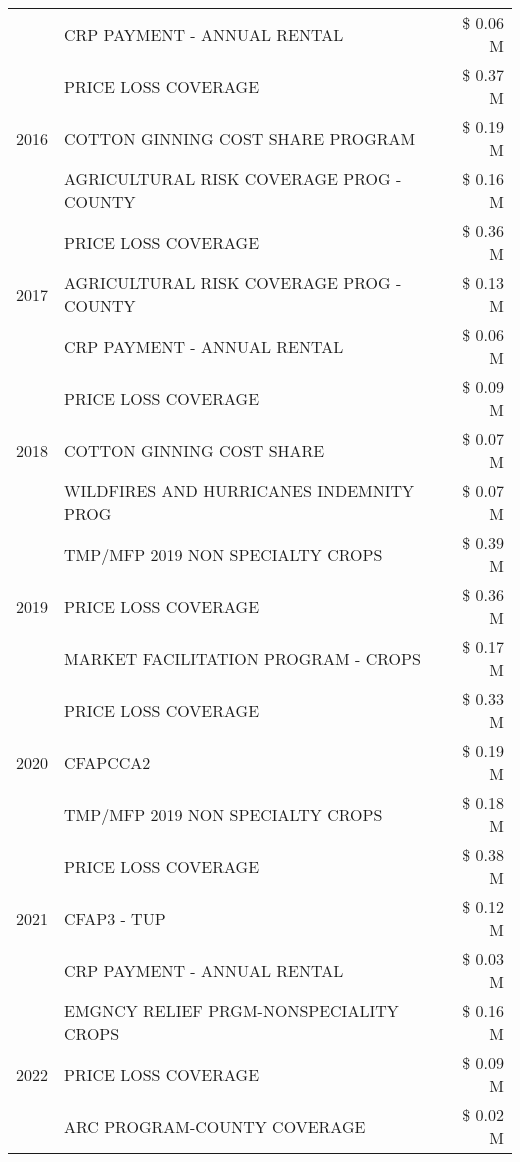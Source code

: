 \begin{tabular}{llr}
 & CRP PAYMENT - ANNUAL RENTAL & \$ 0.06 M \\
\cline{1-3}
\multirow[t]{3}{*}{2016} & PRICE LOSS COVERAGE & \$ 0.37 M \\
 & COTTON GINNING COST SHARE PROGRAM & \$ 0.19 M \\
 & AGRICULTURAL RISK COVERAGE PROG - COUNTY & \$ 0.16 M \\
\cline{1-3}
\multirow[t]{3}{*}{2017} & PRICE LOSS COVERAGE & \$ 0.36 M \\
 & AGRICULTURAL RISK COVERAGE PROG - COUNTY & \$ 0.13 M \\
 & CRP PAYMENT - ANNUAL RENTAL & \$ 0.06 M \\
\cline{1-3}
\multirow[t]{3}{*}{2018} & PRICE LOSS COVERAGE & \$ 0.09 M \\
 & COTTON GINNING COST SHARE & \$ 0.07 M \\
 & WILDFIRES AND HURRICANES INDEMNITY PROG & \$ 0.07 M \\
\cline{1-3}
\multirow[t]{3}{*}{2019} & TMP/MFP 2019 NON SPECIALTY CROPS & \$ 0.39 M \\
 & PRICE LOSS COVERAGE & \$ 0.36 M \\
 & MARKET FACILITATION PROGRAM - CROPS & \$ 0.17 M \\
\cline{1-3}
\multirow[t]{3}{*}{2020} & PRICE LOSS COVERAGE & \$ 0.33 M \\
 & CFAPCCA2 & \$ 0.19 M \\
 & TMP/MFP 2019 NON SPECIALTY CROPS & \$ 0.18 M \\
\cline{1-3}
\multirow[t]{3}{*}{2021} & PRICE LOSS COVERAGE & \$ 0.38 M \\
 & CFAP3 - TUP & \$ 0.12 M \\
 & CRP PAYMENT - ANNUAL RENTAL & \$ 0.03 M \\
\cline{1-3}
\multirow[t]{3}{*}{2022} & EMGNCY RELIEF PRGM-NONSPECIALITY CROPS & \$ 0.16 M \\
 & PRICE LOSS COVERAGE & \$ 0.09 M \\
 & ARC PROGRAM-COUNTY COVERAGE & \$ 0.02 M \\
\cline{1-3}
\bottomrule
\end{tabular}

